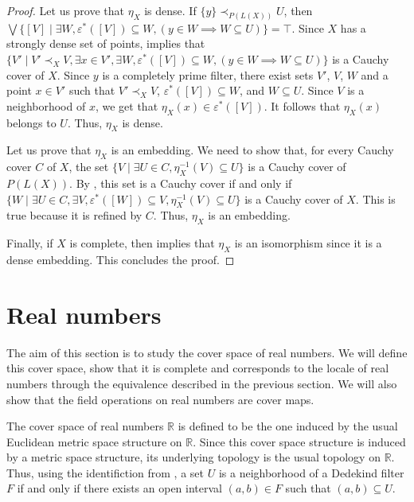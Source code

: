 \documentclass[reqno]{amsart}
\theoremstyle{definition}
\theoremstyle{remark}
\numberwithin{figure}{section}
\newcommand{\rb}{\prec}
\begin{document}
\begin{proof}
Let us prove that $\eta_X$ is dense.
If $\{ y \} \rb_{P(L(X))} U$, then $\bigvee \{ [V] \mid \exists W, \varepsilon^*([V]) \subseteq W, (y \in W \implies W \subseteq U) \} = \top$.
Since $X$ has a strongly dense set of points,  implies that $\{ V' \mid V' \rb_X V, \exists x \in V', \exists W, \varepsilon^*([V]) \subseteq W, (y \in W \implies W \subseteq U) \}$ is a Cauchy cover of $X$.
Since $y$ is a completely prime filter, there exist sets $V'$, $V$, $W$ and a point $x \in V'$ such that $V' \rb_X V$, $\varepsilon^*([V]) \subseteq W$, and $W \subseteq U$.
Since $V$ is a neighborhood of $x$, we get that $\eta_X(x) \in \varepsilon^*([V])$.
It follows that $\eta_X(x)$ belongs to $U$.
Thus, $\eta_X$ is dense.

Let us prove that $\eta_X$ is an embedding.
We need to show that, for every Cauchy cover $C$ of $X$, the set $\{ V \mid \exists U \in C, \eta_X^{-1}(V) \subseteq U \}$ is a Cauchy cover of $P(L(X))$.
By , this set is a Cauchy cover if and only if $\{ W \mid \exists U \in C, \exists V, \varepsilon^*([W]) \subseteq V, \eta_X^{-1}(V) \subseteq U \}$ is a Cauchy cover of $X$.
This is true because it is refined by $C$.
Thus, $\eta_X$ is an embedding.

Finally, if $X$ is complete, then  implies that $\eta_X$ is an isomorphism since it is a dense embedding.
This concludes the proof.
\end{proof}

\section{Real numbers}
\label{sec:reals}

The aim of this section is to study the cover space of real numbers.
We will define this cover space, show that it is complete and corresponds to the locale of real numbers through the equivalence described in the previous section.
We will also show that the field operations on real numbers are cover maps.

The cover space of real numbers $\mathbb{R}$ is defined to be the one induced by the usual Euclidean metric space structure on $\mathbb{R}$.
Since this cover space structure is induced by a metric space structure, its underlying topology is the usual topology on $\mathbb{R}$.
Thus, using the identifiction from , a set $U$ is a neighborhood of a Dedekind filter $F$ if and only if there exists an open interval $(a,b) \in F$ such that $(a,b) \subseteq U$.
\end{document}
